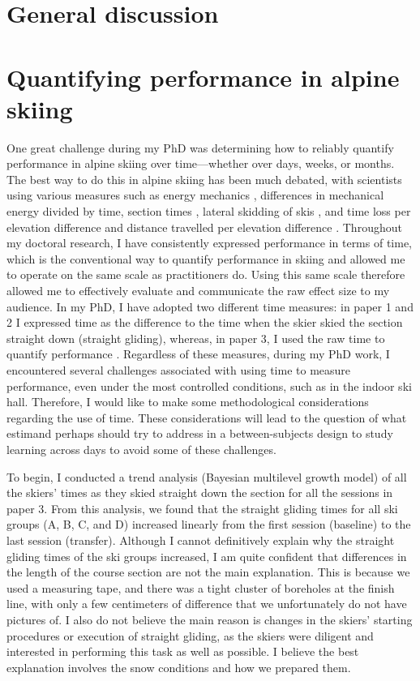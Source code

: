 \section{General discussion}







\section{Quantifying performance in alpine skiing}
One great challenge during my PhD was determining how to reliably quantify performance in alpine skiing over time—whether over days, weeks, or months. The best way to do this in alpine skiing has been much debated, with scientists using various measures such as energy mechanics \cite{supej_differential_2008, supej_how_2010, supej_mechanical_2011} , differences in mechanical energy divided by time, section times \cite{supej_relations_2006}, lateral skidding of skis \cite{kirby_development_2009}, and time loss per elevation difference and distance travelled per elevation difference \cite{federolf_quantifying_2012}. Throughout my doctoral research, I have consistently expressed performance in terms of time, which is the conventional way to quantify performance in skiing and allowed me to operate on the same scale as practitioners do. Using this same scale therefore allowed me to effectively evaluate and communicate the raw effect size to my audience. In my PhD, I have adopted two different time measures: in paper 1 and 2 I expressed time as the difference to the time when the skier skied the section straight down (straight gliding), whereas, in paper 3, I used the raw time to quantify performance . Regardless of these measures, during my PhD work, I encountered several challenges associated with using time to measure performance, even under the most controlled conditions, such as in the indoor ski hall. Therefore, I would like to make some methodological considerations regarding the use of time. These considerations will lead to the question of what estimand perhaps should try to address in a between-subjects design to study learning across days to avoid some of these challenges.

To begin, I conducted a trend analysis (Bayesian multilevel growth model) of all the skiers' times as they skied straight down the section for all the sessions in paper 3. From this analysis, we found that the straight gliding times for all ski groups (A, B, C, and D) increased linearly from the first session (baseline) to the last session (transfer). Although I cannot definitively explain why the straight gliding times of the ski groups increased, I am quite confident that differences in the length of the course section are not the main explanation. This is because we used a measuring tape, and there was a tight cluster of boreholes at the finish line, with only a few centimeters of difference that we unfortunately do not have pictures of. I also do not believe the main reason is changes in the skiers' starting procedures or execution of straight gliding, as the skiers were diligent and interested in performing this task as well as possible. I believe the best explanation involves the snow conditions and how we prepared them.  

